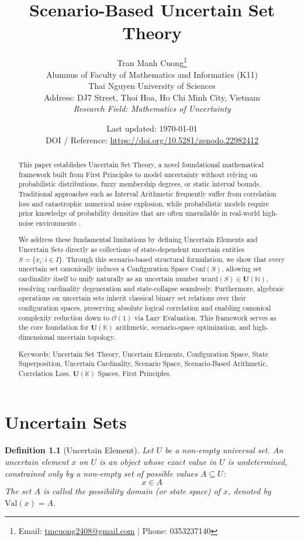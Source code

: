 \documentclass[a4paper,14pt, twoside]{memoir}
\title{Scenario-Based Uncertain Set Theory}
\author{
	Tran Manh Cuong\thanks{Email: \href{mailto:tmcuong2408@gmail.com}{tmcuong2408@gmail.com} | Phone: 0353237140} \\[0.5em]
	\small Alumnus of Faculty of Mathematics and Informatics (K11)
	\\ Thai Nguyen University of Sciences \\
	\small Address: DJ7 Street, Thoi Hoa, Ho Chi Minh City, Vietnam \\
	\small \textit{Research Field: Mathematics of Uncertainty}
}
\date{Last updated: \today \\ \small DOI / Reference: \url{https://doi.org/10.5281/zenodo.22982412} \cite{tran2026extended}}
\newtheorem{definition}{Definition}[chapter]
\begin{document}
	
	\maketitle
	
	\begin{abstract}
		This paper establishes Uncertain Set Theory, a novel foundational mathematical framework built from First Principles to model uncertainty without relying on probabilistic distributions, fuzzy membership degrees, or static interval bounds. Traditional approaches such as Interval Arithmetic frequently suffer from correlation loss and catastrophic numerical noise explosion, while probabilistic models require prior knowledge of probability densities that are often unavailable in real-world high-noise environments \cite{tran2026extended}. 
		
		We address these fundamental limitations by defining Uncertain Elements and Uncertain Sets directly as collections of state-dependent uncertain entities $S = \{x_i : i \in I\}$. Through this scenario-based structural formulation, we show that every uncertain set canonically induces a Configuration Space $\mathrm{Conf}(S)$, allowing set cardinality itself to unify naturally as an uncertain number $\mathrm{ucard}(S) \in \mathbf{U}(\mathbb{N})$, resolving cardinality degeneration and state-collapse seamlessly. Furthermore, algebraic operations on uncertain sets inherit classical binary set relations over their configuration spaces, preserving absolute logical correlation and enabling canonical complexity reduction down to $\mathcal{O}(1)$ via Lazy Evaluation. This framework serves as the core foundation for $\mathbf{U}(\mathbb{K})$ arithmetic, scenario-space optimization, and high-dimensional uncertain topology.
		
		\vspace{1em}
		\noindent Keywords: Uncertain Set Theory, Uncertain Elements, Configuration Space, State Superposition, Uncertain Cardinality, Scenario Space, Scenario-Based Arithmetic, Correlation Loss, $\mathbf{U}(\mathbb{K})$ Spaces, First Principles.
	\end{abstract}
	
	\chapter{Uncertain Sets}
	
	\begin{definition}[Uncertain Element]
		Let $U$ be a non-empty universal set. An uncertain element $x$ on $U$ is an object whose exact value in $U$ is undetermined, constrained only by a non-empty set of possible values $A \subseteq U$:
		\[
		x \in A
		\]
		The set $A$ is called the possibility domain (or state space) of $x$, denoted by $\mathrm{Val}(x) = A$.
	\end{definition}
	
\end{document}
